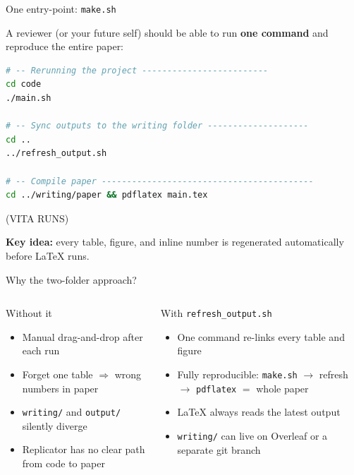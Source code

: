 \documentclass{beamer}
\newcommand{\code}[1]{\texttt{\small#1}}
\begin{document}
\begin{frame}[fragile]{One entry-point: \code{make.sh}}

A reviewer (or your future self) should be able to run
\textbf{one command} and reproduce the entire paper:

\medskip

\begin{lstlisting}[style=repocode, language=bash]
# -- Rerunning the project -------------------------
cd code
./main.sh

# -- Sync outputs to the writing folder --------------------
cd ..
../refresh_output.sh

# -- Compile paper ------------------------------------------
cd ../writing/paper && pdflatex main.tex
\end{lstlisting}
(VITA RUNS)

\bigskip
\textbf{Key idea:} every table, figure, and inline number is
regenerated automatically before \LaTeX{} runs.

\end{frame}

\begin{frame}{Why the two-folder approach?}

\begin{columns}[T]
  \begin{alertblock}{Without it}
    \begin{itemize}
      \item Manual drag-and-drop after each run
      \item Forget one table $\Rightarrow$ wrong numbers in paper
      \item \code{writing/} and \code{output/} silently diverge
      \item Replicator has no clear path from code to paper
    \end{itemize}
  \end{alertblock}

  \begin{exampleblock}{With \code{refresh\_output.sh}}
    \begin{itemize}
      \item One command re-links every table and figure
      \item Fully reproducible: \code{make.sh} $\to$ refresh $\to$ \code{pdflatex} $=$ whole paper
      \item \LaTeX{} always reads the latest output
      \item \code{writing/} can live on Overleaf or a separate git branch
    \end{itemize}
  \end{exampleblock}
\end{columns}

\end{frame}
\end{document}
